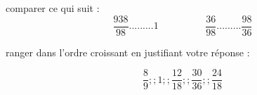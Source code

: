 \documentclass[a4paper,addpoints,12pt]{exam}
\begin{document}
\begin{exo}[2]
\begin{questions}
		\question[1] comparer ce qui suit  :	
$$\dfrac{938}{98}......... 1 \hspace{1cm}   \hspace{1cm}
\dfrac{36}{98}.........\dfrac{98}{36}$$

\question[1] ranger dans l'ordre croissant en justifiant votre réponse :

$$\dfrac{8}{9} ;; 1 ;; \dfrac{12}{18} ;; \dfrac{30}{36}  ;; \dfrac{24}{18}$$	

\end{questions}
\end{exo}
\end{document}
